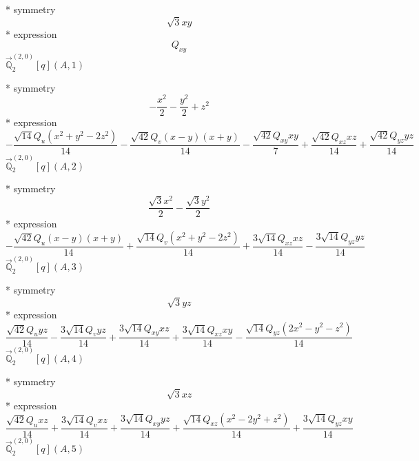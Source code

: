\documentclass[fleqn,8pt]{jsarticle}
\begin{document}
\noindent\quad ** symmetry
\begin{dmath*}
\sqrt{3} x y
\end{dmath*}
\noindent\quad ** expression
\begin{dmath*}
Q_{xy}
\end{dmath*}
\noindent\quad $\vec{\mathbb{Q}}_{2}^{(2,0)}[q](A,1)$

\noindent\quad ** symmetry
\begin{dmath*}
- \frac{x^{2}}{2} - \frac{y^{2}}{2} + z^{2}
\end{dmath*}
\noindent\quad ** expression
\begin{dmath*}
- \frac{\sqrt{14} Q_{u} \left(x^{2} + y^{2} - 2 z^{2}\right)}{14} - \frac{\sqrt{42} Q_{v} \left(x - y\right) \left(x + y\right)}{14} - \frac{\sqrt{42} Q_{xy} x y}{7} + \frac{\sqrt{42} Q_{xz} x z}{14} + \frac{\sqrt{42} Q_{yz} y z}{14}
\end{dmath*}
\noindent\quad $\vec{\mathbb{Q}}_{2}^{(2,0)}[q](A,2)$

\noindent\quad ** symmetry
\begin{dmath*}
\frac{\sqrt{3} x^{2}}{2} - \frac{\sqrt{3} y^{2}}{2}
\end{dmath*}
\noindent\quad ** expression
\begin{dmath*}
- \frac{\sqrt{42} Q_{u} \left(x - y\right) \left(x + y\right)}{14} + \frac{\sqrt{14} Q_{v} \left(x^{2} + y^{2} - 2 z^{2}\right)}{14} + \frac{3 \sqrt{14} Q_{xz} x z}{14} - \frac{3 \sqrt{14} Q_{yz} y z}{14}
\end{dmath*}
\noindent\quad $\vec{\mathbb{Q}}_{2}^{(2,0)}[q](A,3)$

\noindent\quad ** symmetry
\begin{dmath*}
\sqrt{3} y z
\end{dmath*}
\noindent\quad ** expression
\begin{dmath*}
\frac{\sqrt{42} Q_{u} y z}{14} - \frac{3 \sqrt{14} Q_{v} y z}{14} + \frac{3 \sqrt{14} Q_{xy} x z}{14} + \frac{3 \sqrt{14} Q_{xz} x y}{14} - \frac{\sqrt{14} Q_{yz} \left(2 x^{2} - y^{2} - z^{2}\right)}{14}
\end{dmath*}
\noindent\quad $\vec{\mathbb{Q}}_{2}^{(2,0)}[q](A,4)$

\noindent\quad ** symmetry
\begin{dmath*}
\sqrt{3} x z
\end{dmath*}
\noindent\quad ** expression
\begin{dmath*}
\frac{\sqrt{42} Q_{u} x z}{14} + \frac{3 \sqrt{14} Q_{v} x z}{14} + \frac{3 \sqrt{14} Q_{xy} y z}{14} + \frac{\sqrt{14} Q_{xz} \left(x^{2} - 2 y^{2} + z^{2}\right)}{14} + \frac{3 \sqrt{14} Q_{yz} x y}{14}
\end{dmath*}
\noindent\quad $\vec{\mathbb{Q}}_{2}^{(2,0)}[q](A,5)$
\end{document}
